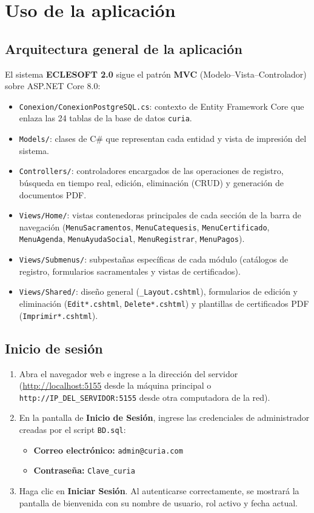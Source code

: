 \chapter{Uso de la aplicación}\label{cap:uso}

\section{Arquitectura general de la aplicación}
El sistema \textbf{ECLESOFT 2.0} sigue el patrón \textbf{MVC} (Modelo--Vista--Controlador) sobre ASP.NET Core 8.0:
\begin{itemize}
    \item \texttt{Conexion/ConexionPostgreSQL.cs}: contexto de Entity Framework Core que enlaza las 24 tablas de la base de datos \texttt{curia}.
    \item \texttt{Models/}: clases de C\# que representan cada entidad y vista de impresión del sistema.
    \item \texttt{Controllers/}: controladores encargados de las operaciones de registro, búsqueda en tiempo real, edición, eliminación (CRUD) y generación de documentos PDF.
    \item \texttt{Views/Home/}: vistas contenedoras principales de cada sección de la barra de navegación (\texttt{MenuSacramentos}, \texttt{MenuCatequesis}, \texttt{MenuCertificado}, \texttt{MenuAgenda}, \texttt{MenuAyudaSocial}, \texttt{MenuRegistrar}, \texttt{MenuPagos}).
    \item \texttt{Views/Submenus/}: subpestañas específicas de cada módulo (catálogos de registro, formularios sacramentales y vistas de certificados).
    \item \texttt{Views/Shared/}: diseño general (\texttt{\_Layout.cshtml}), formularios de edición y eliminación (\texttt{Edit*.cshtml}, \texttt{Delete*.cshtml}) y plantillas de certificados PDF (\texttt{Imprimir*.cshtml}).
\end{itemize}

\section{Inicio de sesión}
\begin{enumerate}
    \item Abra el navegador web e ingrese a la dirección del servidor (\url{http://localhost:5155} desde la máquina principal o \texttt{http://IP\_DEL\_SERVIDOR:5155} desde otra computadora de la red).
    \item En la pantalla de \textbf{Inicio de Sesión}, ingrese las credenciales de administrador creadas por el script \texttt{BD.sql}:
    \begin{itemize}
        \item \textbf{Correo electrónico:} \texttt{admin@curia.com}
        \item \textbf{Contraseña:} \texttt{Clave\_curia}
    \end{itemize}
    \item Haga clic en \textbf{Iniciar Sesión}. Al autenticarse correctamente, se mostrará la pantalla de bienvenida con su nombre de usuario, rol activo y fecha actual.
\end{enumerate}

